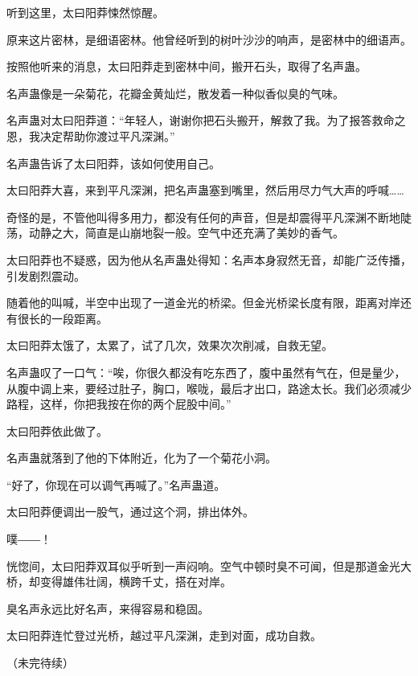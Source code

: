 \begin{this_body}
听到这里，太曰阳莽悚然惊醒。

原来这片密林，是细语密林。他曾经听到的树叶沙沙的响声，是密林中的细语声。

按照他听来的消息，太曰阳莽走到密林中间，搬开石头，取得了名声蛊。

名声蛊像是一朵菊花，花瓣金黄灿烂，散发着一种似香似臭的气味。

名声蛊对太曰阳莽道：“年轻人，谢谢你把石头搬开，解救了我。为了报答救命之恩，我决定帮助你渡过平凡深渊。”

名声蛊告诉了太曰阳莽，该如何使用自己。

太曰阳莽大喜，来到平凡深渊，把名声蛊塞到嘴里，然后用尽力气大声的呼喊……

奇怪的是，不管他叫得多用力，都没有任何的声音，但是却震得平凡深渊不断地陡荡，动静之大，简直是山崩地裂一般。空气中还充满了美妙的香气。

太曰阳莽也不疑惑，因为他从名声蛊处得知：名声本身寂然无音，却能广泛传播，引发剧烈震动。

随着他的叫喊，半空中出现了一道金光的桥梁。但金光桥梁长度有限，距离对岸还有很长的一段距离。

太曰阳莽太饿了，太累了，试了几次，效果次次削减，自救无望。

名声蛊叹了一口气：“唉，你很久都没有吃东西了，腹中虽然有气在，但是量少，从腹中调上来，要经过肚子，胸口，喉咙，最后才出口，路途太长。我们必须减少路程，这样，你把我按在你的两个屁股中间。”

太曰阳莽依此做了。

名声蛊就落到了他的下体附近，化为了一个菊花小洞。

“好了，你现在可以调气再喊了。”名声蛊道。

太曰阳莽便调出一股气，通过这个洞，排出体外。

噗――！

恍惚间，太曰阳莽双耳似乎听到一声闷响。空气中顿时臭不可闻，但是那道金光大桥，却变得雄伟壮阔，横跨千丈，搭在对岸。

臭名声永远比好名声，来得容易和稳固。

太曰阳莽连忙登过光桥，越过平凡深渊，走到对面，成功自救。

（未完待续）

\end{this_body}

